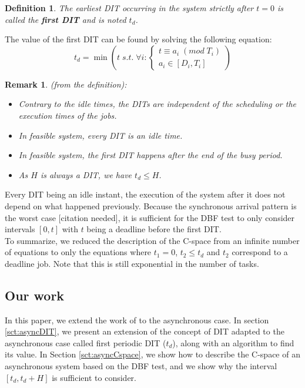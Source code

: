 \documentclass[times, 10pt,twocolumn, a4paper]{article}
\newtheorem{definition}{Definition}
\newtheorem{remark}{Remark}
\begin{document}
\begin{definition}
The earliest DIT occurring in the system strictly after $t=0$ is called the \textbf{first DIT} and is noted $t_d$.
\end{definition}

The value of the first DIT can be found by solving the following equation:
\[
  t_d = \min \left( t \; s.t. \; \forall i:
  \left\{
  \begin{array}{c}
    t \equiv a_i \; (mod \; T_i) \\
    a_i \in [D_i, T_i]
  \end{array}
  \right.
  \right)
\]

\begin{remark} (from the definition):
 \begin{itemize}
  \item Contrary to the idle times, the DITs are independent of the scheduling or the execution times of the jobs.
  \item In feasible system, every DIT is an idle time.
  \item In feasible system, the first DIT happens after the end of the busy period.
  \item As $H$ is always a DIT, we have $t_d \leq H$.
 \end{itemize}
\end{remark}

Every DIT being an idle instant, the execution of the system after it does not depend on what happened previously. Because the synchronous arrival pattern is the worst case [citation needed], it is sufficient for the DBF test to only consider intervals $[0, t]$ with $t$ being a deadline before the first DIT.\\

To summarize, we reduced the description of the C-space from an infinite number of equations to only the equations where $t_1 = 0$, $t_2 \leq t_d$ and $t_2$ correspond to a deadline job. Note that this is still exponential in the number of tasks.

  \subsection{Our work}

  In this paper, we extend the work of \cite{george2009characterization} to the asynchronous case. In section \ref{sct:asyncDIT}, we present an extension of the concept of DIT adapted to the asynchronous case called first periodic DIT ($t_d$), along with an algorithm to find its value. In Section \ref{sct:asyncCspace}, we show how to describe the C-space of an asynchronous system based on the DBF test, and we show why the interval $[t_d, t_d + H]$ is sufficient to consider.
\end{document}
